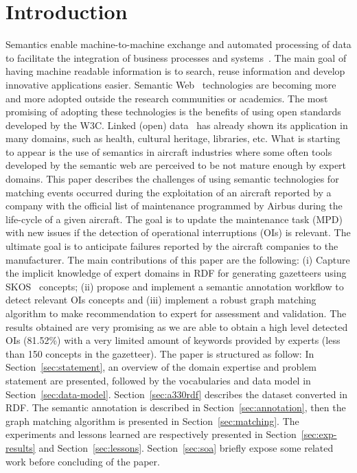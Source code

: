 \documentclass[a4paper,english,submission]{rnti}  %
\affiliation{
    \affil{1}Mondeca, \\35, Boulevard Strasbourg, Paris France\\
          ghislain.atemezing@mondeca.com,\\
          \http{http://www.mondeca.com}\\
    
 }
\begin{document}

%
\section{Introduction}
\label{sec:introduction}
Semantics enable machine-to-machine exchange and automated processing of data to facilitate the integration of business processes and systems~\citep{cardoso2007}. The main goal of having machine readable information is to search, reuse information and develop innovative applications easier. 
Semantic Web~\citep{berners2001} technologies are becoming more and more adopted outside the research communities or academics. The most promising of adopting these technologies is the benefits of using open standards developed by the W3C. Linked (open) data~\citep{bizer2009} has already shown its application in many domains, such as health, cultural heritage, libraries, etc. What is starting to appear is the use of semantics in aircraft industries where some often tools developed by the semantic web are perceived to be not mature enough by expert domains. This paper describes the challenges of using semantic technologies for matching events occurred during the exploitation of an aircraft reported by a company with the official list of maintenance programmed by Airbus during the life-cycle of a given aircraft. The goal is to update the maintenance task (MPD) with new issues if the detection of operational interruptions (OIs) is relevant. The ultimate goal is to anticipate failures reported by the aircraft companies to the manufacturer. The main contributions of this paper are the following: (i) Capture the implicit knowledge of expert domains in RDF for generating gazetteers using SKOS~\citep{skosw3c} concepts;  (ii) propose and implement a semantic annotation workflow to detect relevant OIs concepts and (iii) implement a robust graph matching algorithm to make recommendation to expert for assessment and validation. The results obtained are very promising as we are able to obtain a high level detected OIs (81.52\%) with a very limited amount of keywords provided by experts (less than 150 concepts in the gazetteer). The paper is structured as follow: In Section~\ref{sec:statement}, an overview of the domain expertise and problem statement are presented, followed by the vocabularies and data model in Section~\ref{sec:data-model}. Section~\ref{sec:a330rdf} describes the dataset converted in RDF. The semantic annotation is described in Section~\ref{sec:annotation}, then the graph matching algorithm is presented in Section~\ref{sec:matching}. The experiments and lessons learned are respectively presented in Section~\ref{sec:exp-results} and Section~\ref{sec:lessons}. Section~\ref{sec:soa} briefly expose some related work before concluding of the paper.    
\end{document}
